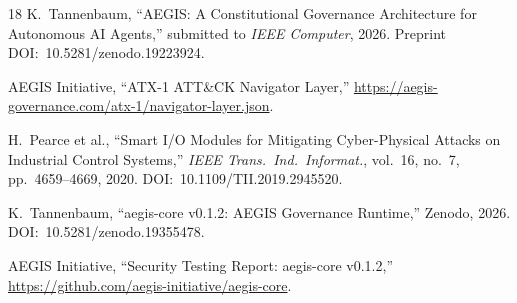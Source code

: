 \documentclass[journal]{IEEEtran}
\begin{document}
\begin{thebibliography}{18}
K.~Tannenbaum, ``AEGIS: A Constitutional Governance Architecture for Autonomous AI Agents,'' submitted to \textit{IEEE Computer}, 2026. Preprint DOI:~10.5281/zenodo.19223924.

AEGIS Initiative, ``ATX-1 ATT\&CK Navigator Layer,'' \url{https://aegis-governance.com/atx-1/navigator-layer.json}.

H.~Pearce et al., ``Smart I/O Modules for Mitigating Cyber-Physical Attacks on Industrial Control Systems,'' \textit{IEEE Trans.\ Ind.\ Informat.}, vol.~16, no.~7, pp.~4659--4669, 2020. DOI:~10.1109/TII.2019.2945520.

K.~Tannenbaum, ``aegis-core v0.1.2: AEGIS Governance Runtime,'' Zenodo, 2026. DOI:~10.5281/zenodo.19355478.

AEGIS Initiative, ``Security Testing Report: aegis-core v0.1.2,'' \url{https://github.com/aegis-initiative/aegis-core}.

\end{thebibliography}
\end{document}
